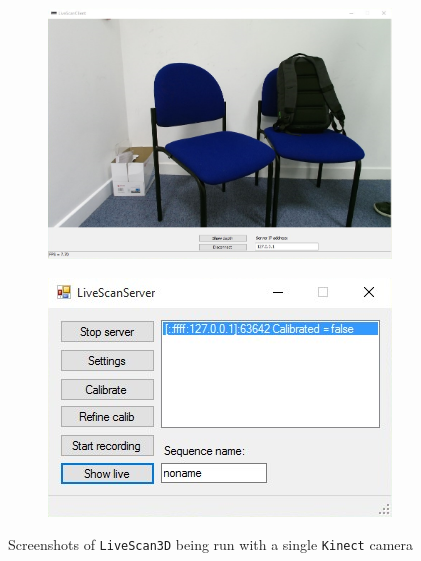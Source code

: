 \documentclass{article}
\begin{document}
\begin{figure}[h]
\centering
\begin{subfigure}{.49\textwidth}
  \centering
  \includegraphics[scale=0.4]{livescanclient}
\end{subfigure}
\begin{subfigure}{.49\textwidth}
  \centering
  \includegraphics[scale=1.2]{livescanserver}
\end{subfigure}
  \caption{Screenshots of \texttt{LiveScan3D} \cite{livescan} being run with a single \texttt{Kinect} camera}
  \label{fig:livescan}
\end{figure}

\newpage
\end{document}
